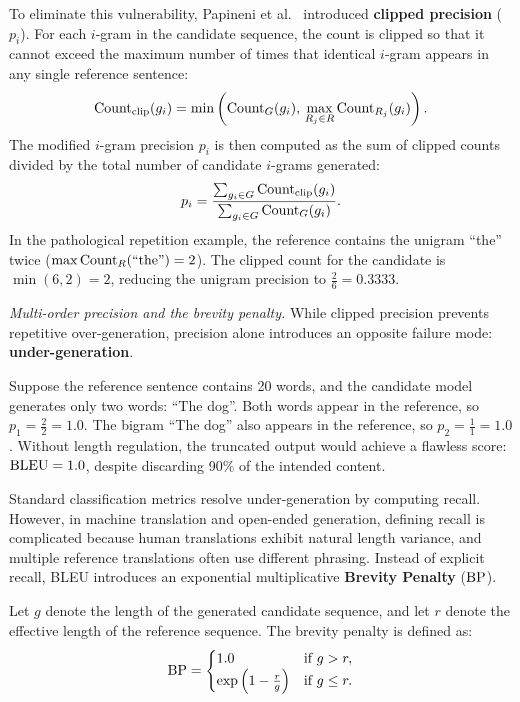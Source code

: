 \documentclass[../../main.tex]{subfiles}
\begin{document}
To eliminate this vulnerability, Papineni et al.~\cite{papineni2002bleu} introduced \textbf{clipped precision} ($p_i$). For each $i$-gram in the candidate sequence, the count is clipped so that it cannot exceed the maximum number of times that identical $i$-gram appears in any single reference sentence:
\begin{equation}
\label{eq:clipped_ngram_count}
\operatorname{Count}_{\text{clip}}(g_i) = \min\left( \operatorname{Count}_G(g_i), \, \max_{R_j \in R} \operatorname{Count}_{R_j}(g_i) \right).
\end{equation}
The modified $i$-gram precision $p_i$ is then computed as the sum of clipped counts divided by the total number of candidate $i$-grams generated:
\begin{equation}
\label{eq:bleu_modified_precision}
p_i = \frac{\sum_{g_i \in G} \operatorname{Count}_{\text{clip}}(g_i)}{\sum_{g_i \in G} \operatorname{Count}_G(g_i)}.
\end{equation}
In the pathological repetition example, the reference contains the unigram ``the'' twice ($\max \operatorname{Count}_R(\text{``the''}) = 2$). The clipped count for the candidate is $\min(6, 2) = 2$, reducing the unigram precision to $\frac{2}{6} = 0.3333$.

\textit{Multi-order precision and the brevity penalty.} While clipped precision prevents repetitive over-generation, precision alone introduces an opposite failure mode: \textbf{under-generation}. 

Suppose the reference sentence contains 20 words, and the candidate model generates only two words: ``The dog''. Both words appear in the reference, so $p_1 = \frac{2}{2} = 1.0$. The bigram ``The dog'' also appears in the reference, so $p_2 = \frac{1}{1} = 1.0$. Without length regulation, the truncated output would achieve a flawless score: $\mathrm{BLEU} = 1.0$, despite discarding 90\% of the intended content.

Standard classification metrics resolve under-generation by computing recall. However, in machine translation and open-ended generation, defining recall is complicated because human translations exhibit natural length variance, and multiple reference translations often use different phrasing. Instead of explicit recall, BLEU introduces an exponential multiplicative \textbf{Brevity Penalty} ($\mathrm{BP}$).

Let $g$ denote the length of the generated candidate sequence, and let $r$ denote the effective length of the reference sequence. The brevity penalty is defined as:
\begin{equation}
\label{eq:brevity_penalty_def}
\mathrm{BP} = \begin{cases} 
1.0 & \text{if } g > r, \\
\exp\left( 1 - \frac{r}{g} \right) & \text{if } g \le r.
\end{cases}
\end{equation}
\end{document}
